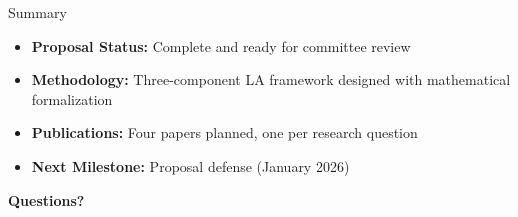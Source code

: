 \documentclass[10pt,xcolor={table,dvipsnames},t]{beamer}
\begin{document}
\begin{frame}{Summary}

\begin{itemize}
  \item \textbf{Proposal Status:} Complete and ready for committee review

  \vspace{0.5em}
  \item \textbf{Methodology:} Three-component LA framework designed with mathematical formalization

  \vspace{0.5em}

  \vspace{0.5em}
  \item \textbf{Publications:} Four papers planned, one per research question

  \vspace{0.5em}
  \item \textbf{Next Milestone:} Proposal defense (January 2026)
\end{itemize}

\vspace{1em}
\centering
\textbf{Questions?}

\end{frame}
\end{document}
